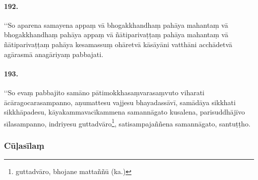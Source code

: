 \paragraph{192.} ‘‘So aparena samayena appaṃ vā bhogakkhandhaṃ pahāya mahantaṃ vā bhogakkhandhaṃ pahāya appaṃ vā ñātiparivaṭṭaṃ pahāya mahantaṃ vā ñātiparivaṭṭaṃ pahāya kesamassuṃ ohāretvā kāsāyāni vatthāni acchādetvā agārasmā anagāriyaṃ pabbajati.

\paragraph{193.} ‘‘So evaṃ pabbajito samāno pātimokkhasaṃvarasaṃvuto viharati ācāragocarasampanno, aṇumattesu vajjesu bhayadassāvī, samādāya sikkhati sikkhāpadesu, kāyakammavacīkammena samannāgato kusalena, parisuddhājīvo sīlasampanno, indriyesu guttadvāro\footnote{guttadvāro, bhojane mattaññū (ka.)}, satisampajaññena samannāgato, santuṭṭho.

\subsubsection{Cūḷasīlaṃ}

